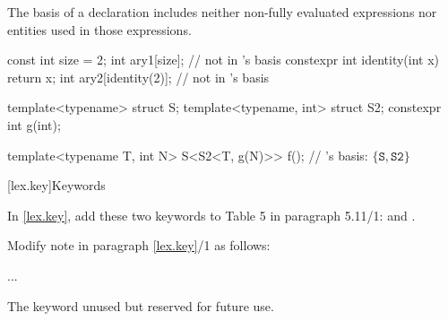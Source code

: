 \begin{std.txt}

\alinea
\enternote
The basis of a declaration includes neither non-fully evaluated expressions nor
entities used in those expressions.
\begin{example}
   \begin{codeblock}
    const int size = 2;
    int ary1[size];                         //  not in 's basis
    constexpr int identity(int x) { return x; }
    int ary2[identity(2)];                  //  not in 's basis

    template<typename> struct S;
    template<typename, int> struct S2;
    constexpr int g(int);

    template<typename T, int N>
    S<S2<T, g(N)>> f();                     // 's basis: $\{ \mathtt{S}, \mathtt{S2} \}$ 
   \end{codeblock}
\end{example}
\exitnote

\end{std.txt}


\setcounter{section}{10}
[lex.key]{Keywords}

In \ref{lex.key}, add these two keywords to Table 5 in paragraph
5.11/1:  and .

\noindent
Modify note in paragraph \ref{lex.key}/1 as follows:
\begin{std.txt}
    \resetalinea[0]
    \alinea
    ...


    \enternote
    The   keyword 
    unused but   
    reserved for future use.
    \exitnote
\end{std.txt}